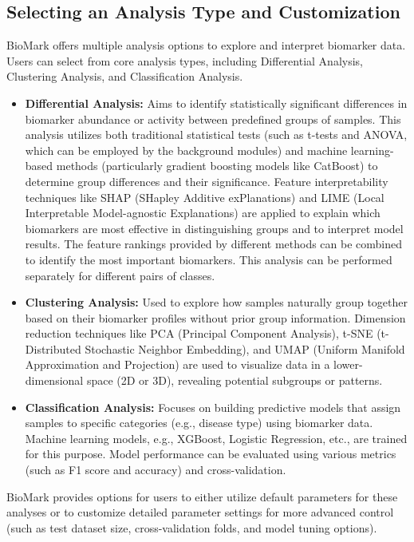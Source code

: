\documentclass[journal]{IEEEtran}
\begin{document}
\subsection{Selecting an Analysis Type and Customization}
BioMark offers multiple analysis options to explore and interpret biomarker data. Users can select from core analysis types, including Differential Analysis, Clustering Analysis, and Classification Analysis.
\begin{itemize}
\item \textbf{Differential Analysis:} Aims to identify statistically significant differences in biomarker abundance or activity between predefined groups of samples. This analysis utilizes both traditional statistical tests (such as t-tests and ANOVA, which can be employed by the background modules) and machine learning-based methods (particularly gradient boosting models like CatBoost) to determine group differences and their significance. Feature interpretability techniques like SHAP (SHapley Additive exPlanations) \cite{Lundberg2017_SHAP, Lundberg2020_TreeSHAP} and LIME (Local Interpretable Model-agnostic Explanations) \cite{Ribeiro2016_LIME} are applied to explain which biomarkers are most effective in distinguishing groups and to interpret model results. The feature rankings provided by different methods can be combined to identify the most important biomarkers. This analysis can be performed separately for different pairs of classes.
\item \textbf{Clustering Analysis:} Used to explore how samples naturally group together based on their biomarker profiles without prior group information. Dimension reduction techniques like PCA (Principal Component Analysis), t-SNE (t-Distributed Stochastic Neighbor Embedding), and UMAP (Uniform Manifold Approximation and Projection) are used to visualize data in a lower-dimensional space (2D or 3D), revealing potential subgroups or patterns.
\item \textbf{Classification Analysis:} Focuses on building predictive models that assign samples to specific categories (e.g., disease type) using biomarker data. Machine learning models, e.g., XGBoost, Logistic Regression, etc., are trained for this purpose. Model performance can be evaluated using various metrics (such as F1 score and accuracy) and cross-validation. 
\end{itemize}
BioMark provides options for users to either utilize default parameters for these analyses or to customize detailed parameter settings for more advanced control (such as test dataset size, cross-validation folds, and model tuning options).
\end{document}
